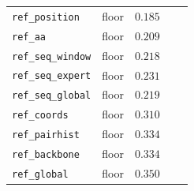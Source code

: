 \begin{longtable}{lrrrr}
\texttt{ref\_position} & floor & $0.185$ & & \\
\texttt{ref\_aa} & floor & $0.209$ & & \\
\texttt{ref\_seq\_window} & floor & $0.218$ & & \\
\texttt{ref\_seq\_expert} & floor & $0.231$ & & \\
\texttt{ref\_seq\_global} & floor & $0.219$ & & \\
\texttt{ref\_coords} & floor & $0.310$ & & \\
\texttt{ref\_pairhist} & floor & $0.334$ & & \\
\texttt{ref\_backbone} & floor & $0.334$ & & \\
\texttt{ref\_global} & floor & $0.350$ & & \\

\end{longtable}
\endgroup
